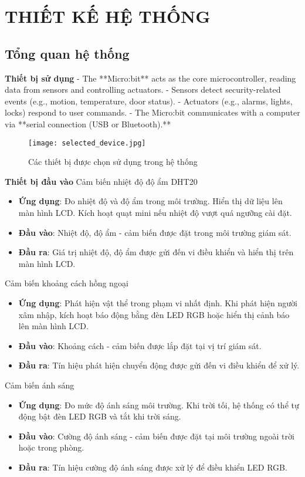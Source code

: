 \newpage
\section{THIẾT KẾ HỆ THỐNG}
\subsection{Tổng quan hệ thống}

\textbf{Thiết bị sử dụng}
- The **Micro:bit** acts as the core microcontroller,      reading data from sensors and controlling actuators.
- Sensors detect security-related events (e.g., motion,      temperature, door status).
- Actuators (e.g., alarms, lights, locks) respond to      user commands.
- The Micro:bit communicates with a computer via **serial      connection (USB or Bluetooth).**


\begin{figure}[H]
    \centering
    \texttt{[image: selected\_device.jpg]}
    \caption{Các thiết bị được chọn sử dụng trong hệ thống}
    \label{fig:selected_device}
\end{figure}

\textbf{Thiết bị đầu vào}
Cảm biến nhiệt độ độ ẩm DHT20
\begin{itemize}
    \item \textbf{Ứng dụng}: Đo nhiệt độ và độ ẩm trong môi trường. Hiển thị dữ liệu lên màn hình LCD. Kích hoạt quạt mini nếu nhiệt độ vượt quá ngưỡng cài đặt.
    \item \textbf{Đầu vào}: Nhiệt độ, độ ẩm - cảm biến được đặt trong môi trường giám sát.
    \item \textbf{Đầu ra}: Giá trị nhiệt độ, độ ẩm được gửi đến vi điều khiển và hiển thị trên màn hình LCD.
\end{itemize}

Cảm biến khoảng cách hồng ngoại
\begin{itemize}
    \item \textbf{Ứng dụng}: Phát hiện vật thể trong phạm vi nhất định. Khi phát hiện người xâm nhập, kích hoạt báo động bằng đèn LED RGB hoặc hiển thị cảnh báo lên màn hình LCD.
    \item \textbf{Đầu vào}: Khoảng cách - cảm biến được lắp đặt tại vị trí giám sát.
    \item \textbf{Đầu ra}: Tín hiệu phát hiện chuyển động được gửi đến vi điều khiển để xử lý.
\end{itemize}

Cảm biến ánh sáng
\begin{itemize}
    \item \textbf{Ứng dụng}: Đo mức độ ánh sáng môi trường. Khi trời tối, hệ thống có thể tự động bật đèn LED RGB và tắt khi trời sáng.
    \item \textbf{Đầu vào}: Cường độ ánh sáng - cảm biến được đặt tại môi trường ngoài trời hoặc trong phòng.
    \item \textbf{Đầu ra}: Tín hiệu cường độ ánh sáng được xử lý để điều khiển LED RGB.
\end{itemize}

